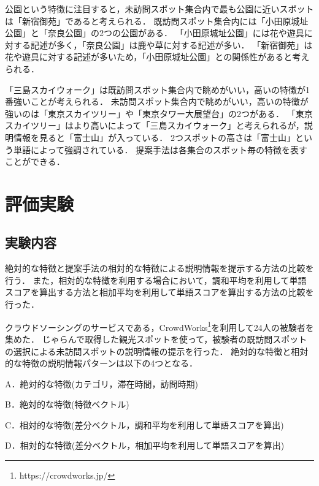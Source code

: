 \documentclass{deimj}
\begin{document}
公園という特徴に注目すると，未訪問スポット集合内で最も公園に近いスポットは「新宿御苑」であると考えられる．
既訪問スポット集合内には「小田原城址公園」と「奈良公園」の2つの公園がある．
「小田原城址公園」には花や遊具に対する記述が多く，「奈良公園」は鹿や草に対する記述が多い．
「新宿御苑」は花や遊具に対する記述が多いため，「小田原城址公園」との関係性があると考えられる．

「三島スカイウォーク」は既訪問スポット集合内で眺めがいい，高いの特徴が1番強いことが考えられる．
未訪問スポット集合内で眺めがいい，高いの特徴が強いのは「東京スカイツリー」や「東京タワー大展望台」の2つがある．
「東京スカイツリー」はより高いによって「三島スカイウォーク」と考えられるが，説明情報を見ると「富士山」が入っている．
2つスポットの高さは「富士山」という単語によって強調されている．
提案手法は各集合のスポット毎の特徴を表すことができる．


\section{評価実験}
\label{sec:評価実験}

\subsection{実験内容}

絶対的な特徴と提案手法の相対的な特徴による説明情報を提示する方法の比較を行う．
また，相対的な特徴を利用する場合において，調和平均を利用して単語スコアを算出する方法と相加平均を利用して単語スコアを算出する方法の比較を行った．

クラウドソーシングのサービスである，CrowdWorks\footnote{https://crowdworks.jp/}を利用して24人の被験者を集めた．
じゃらんで取得した観光スポットを使って，被験者の既訪問スポットの選択による未訪問スポットの説明情報の提示を行った．
絶対的な特徴と相対的な特徴の説明情報パターンは以下の4つとなる．
\begin{description}
  \item A．絶対的な特徴(カテゴリ，滞在時間，訪問時期)
  \item B．絶対的な特徴(特徴ベクトル)
  \item C．相対的な特徴(差分ベクトル，調和平均を利用して単語スコアを算出)
  \item D．相対的な特徴(差分ベクトル，相加平均を利用して単語スコアを算出)
\end{description}
\end{document}
